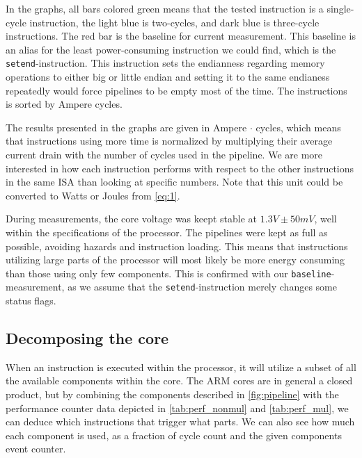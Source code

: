 In the graphs, all bars colored green means that the tested instruction is a
single-cycle instruction, the light blue is two-cycles, and dark blue is
three-cycle instructions. The red bar is the baseline for current measurement.
This baseline is an alias for the least power-consuming instruction we could
find, which is the \texttt{setend}-instruction. This instruction sets the
endianness regarding memory operations to either big or little endian
\cite{armcompilerref} and setting it to the same endianess repeatedly would
force pipelines to be empty most of the time. The instructions is sorted by
Ampere cycles.

The results presented in the graphs are given in Ampere $\cdot$ cycles, which
means that instructions using more time is normalized by multiplying their
average current drain with the number of cycles used in the pipeline. We are
more interested in how each instruction performs with respect to the other
instructions in the same ISA than looking at specific numbers. Note that this
unit could be converted to Watts or Joules from \autoref{eq:1}.

During measurements, the core voltage was keept stable at $1.3V\pm50mV$, well
within the specifications of the processor. The pipelines were kept as full as
possible, avoiding hazards and instruction loading. This means that instructions
utilizing large parts of the processor will most likely be more energy consuming
than those using only few components. This is confirmed with our
\texttt{baseline}-measurement, as we assume that the \texttt{setend}-instruction
merely changes some status flags.

\subsection{Decomposing the core}
When an instruction is executed within the processor, it will utilize a subset
of all the available components within the core. The ARM cores are in general a
closed product, but by combining the components described in
\autoref{fig:pipeline} with the performance counter data depicted in
\autoref{tab:perf_nonmul} and \autoref{tab:perf_mul}, we can deduce which
instructions that trigger what parts. We can also see how much each component is
used, as a fraction of cycle count and the given components event counter.

